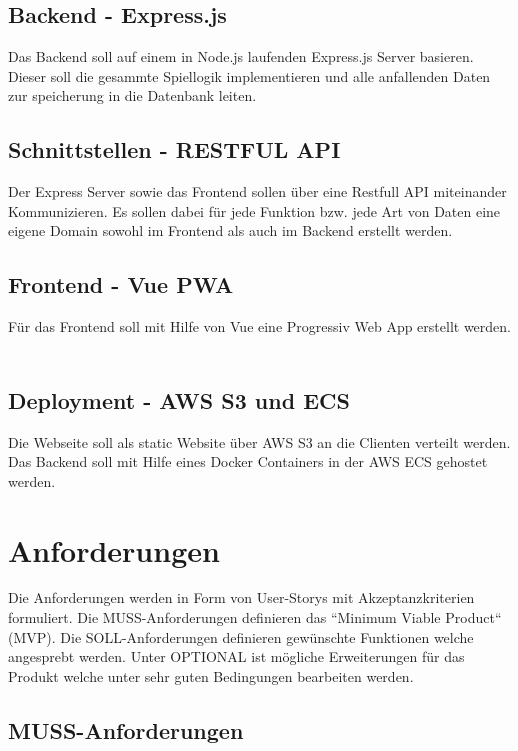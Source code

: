 \documentclass[conference]{IEEEtran}
\begin{document}
	\subsection{Backend - Express.js}
	Das Backend soll auf einem in Node.js laufenden Express.js Server basieren. Dieser soll die gesammte Spiellogik implementieren und alle anfallenden Daten zur speicherung in die Datenbank leiten.
    \ \\
	\subsection{Schnittstellen - RESTFUL API}
	Der Express Server sowie das Frontend sollen über eine Restfull API miteinander Kommunizieren. Es sollen dabei für jede Funktion bzw. jede Art von Daten eine eigene Domain sowohl im Frontend als auch im Backend erstellt werden.
	\ \\
	\subsection{Frontend - Vue PWA}
	Für das Frontend soll mit Hilfe von Vue eine Progressiv Web App erstellt werden.
    \ \\
	\subsection{Deployment - AWS S3 und ECS}
	Die Webseite soll als static Website über AWS S3 an die Clienten verteilt werden. Das Backend soll mit Hilfe eines Docker Containers in der AWS ECS gehostet werden.
	\ \\
	\section{Anforderungen}
	Die Anforderungen werden in Form von User-Storys mit Akzeptanzkriterien formuliert. Die MUSS-Anforderungen definieren das ``Minimum Viable Product`` (MVP). Die SOLL-Anforderungen definieren gewünschte Funktionen welche angesprebt werden. Unter OPTIONAL ist mögliche Erweiterungen für das Produkt welche unter sehr guten Bedingungen bearbeiten werden.
	\subsection{MUSS-Anforderungen}
\end{document}
